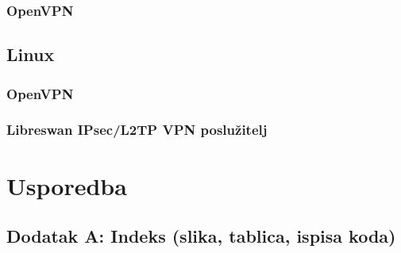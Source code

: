 \documentclass[a4paper, 12pt]{article}
\begin{document}
	\subsubsection{OpenVPN}
	

	\newpage
	\subsection{Linux}
	
	\subsubsection{OpenVPN}
	
	\newpage
	\subsubsection{Libreswan IPsec/L2TP VPN poslužitelj}
	

        \newpage
        \section{Usporedba} 
        
	



	\newpage
	
	
	\nocite{*}
	
	\newpage
	\begin{appendices}
		\section{Dodatak A: Indeks (slika, tablica, ispisa koda)}
			\renewcommand\listfigurename{}
			\listoffigures
		


	\end{appendices}
	
\end{document}
